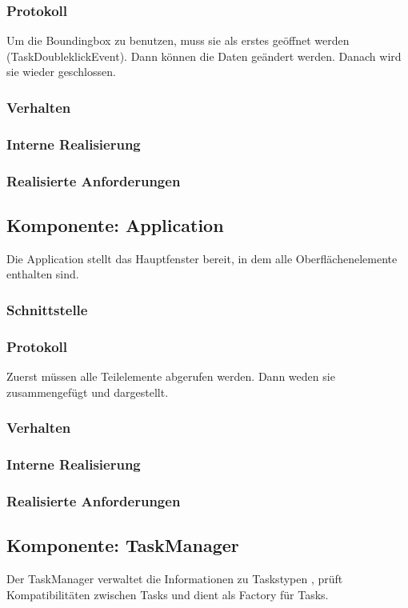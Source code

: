 \documentclass[a4paper,12pt]{scrartcl}
\begin{document}
\subsubsection{Protokoll}
Um die Boundingbox zu benutzen, muss sie als erstes geöffnet werden (TaskDoubleklickEvent). Dann können die Daten geändert werden. Danach wird sie wieder geschlossen.
\subsubsection{Verhalten}
\subsubsection{Interne Realisierung}
\subsubsection{Realisierte Anforderungen}

\subsection{Komponente: Application}
Die Application stellt das Hauptfenster bereit, in dem alle Oberflächenelemente enthalten sind.
\subsubsection{Schnittstelle}
\subsubsection{Protokoll}
Zuerst müssen alle Teilelemente abgerufen werden. Dann weden sie zusammengefügt und dargestellt.
\subsubsection{Verhalten}
\subsubsection{Interne Realisierung}
\subsubsection{Realisierte Anforderungen}

\subsection{Komponente: TaskManager}
Der TaskManager verwaltet die Informationen zu Taskstypen , prüft Kompatibilitäten zwischen Tasks und dient als Factory für Tasks.
\end{document}

